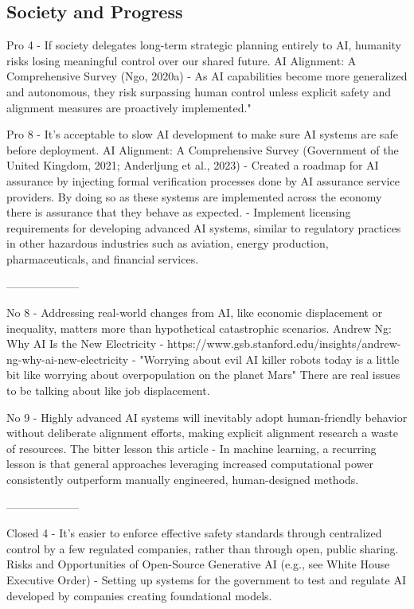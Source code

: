 \subsection{Society and Progress}

Pro 4 - If society delegates long-term strategic planning entirely to AI, humanity risks losing meaningful control over our shared future.
AI Alignment: A Comprehensive Survey
(Ngo, 2020a)
\citep{ngo_agi_2020} - As AI capabilities become more generalized and autonomous, they risk surpassing human control unless explicit safety and alignment measures are proactively implemented."

Pro 8 - It's acceptable to slow AI development to make sure AI systems are safe before deployment.
AI Alignment: A Comprehensive Survey
(Government of the United Kingdom, 2021; Anderljung et al., 2023)
\citep{government_of_the_united_kingdom_roadmap_2021} - Created a roadmap for AI assurance by injecting formal verification processes done by AI assurance service providers. By doing so as these systems are implemented across the economy there is assurance that they behave as expected.
\citep{anderljung_frontier_2023} - Implement licensing requirements for developing advanced AI systems, similar to regulatory practices in other hazardous industries such as aviation, energy production, pharmaceuticals, and financial services.

--------------------

No 8 - Addressing real-world changes from AI, like economic displacement or inequality, matters more than hypothetical catastrophic scenarios.
Andrew Ng: Why AI Is the New Electricity - https://www.gsb.stanford.edu/insights/andrew-ng-why-ai-new-electricity
\citep{ng_andrew_2017} - "Worrying about evil AI killer robots today is a little bit like worrying about overpopulation on the planet Mars" There are real issues to be talking about like job displacement.

No 9 - Highly advanced AI systems will inevitably adopt human-friendly behavior without deliberate alignment efforts, making explicit alignment research a waste of resources.
The bitter lesson
this article
\citep{sutton_bitter_2019} - In machine learning, a recurring lesson is that general approaches leveraging increased computational power consistently outperform manually engineered, human-designed methods.

--------------------

Closed 4 - It's easier to enforce effective safety standards through centralized control by a few regulated companies, rather than through open, public sharing.
Risks and Opportunities of Open-Source Generative AI
(e.g., see White House Executive Order)
\citep{the_white_house_fact_2023} - Setting up systems for the government to test and regulate AI developed by companies creating foundational models.

